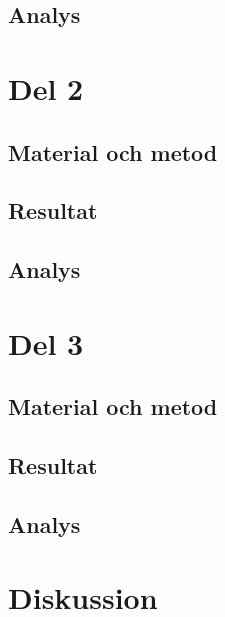 \documentclass[11p]{article}
\begin{document}
    \subsection{Analys}
    \section{Del 2}
    \subsection{Material och metod}
    \subsection{Resultat}
    \subsection{Analys}
    \section{Del 3}
    \subsection{Material och metod}
    \subsection{Resultat}
    \subsection{Analys}
    \section{Diskussion}
\end{document}
